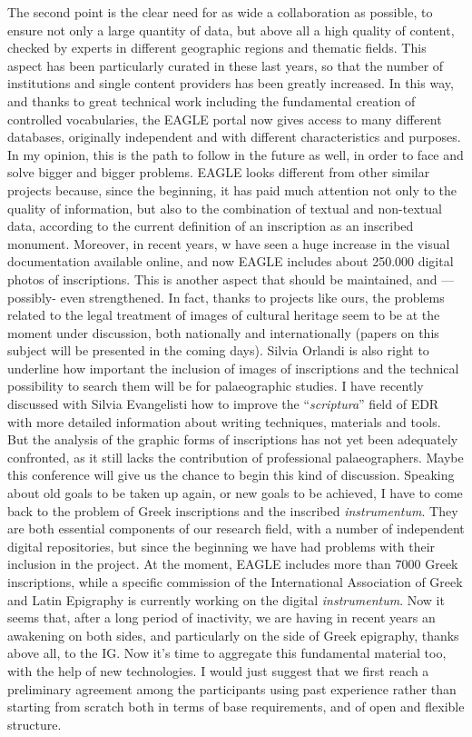 The second point is the clear need for as wide a collaboration as possible, to ensure not only a large quantity of data, but above all a high quality of content, checked by experts in different geographic regions and thematic fields. This aspect has been particularly curated in these last years, so that the number of institutions and single content providers has been greatly increased. In this way, and thanks to great technical work including the fundamental creation of controlled vocabularies, the EAGLE portal now gives access to many different databases, originally independent and with different characteristics and purposes. In my opinion, this is the path to follow in the future as well, in order to face and solve bigger and bigger problems.
EAGLE looks different from other similar projects because, since the beginning, it has paid much attention not only to the quality of information, but also to the combination of textual and non-textual data, according to the current definition of an inscription as an inscribed monument. Moreover, in recent years, w have seen a huge increase in the visual documentation available online, and now EAGLE includes about 250.000 digital photos of inscriptions. This is another aspect that should be maintained, and --- possibly- even strengthened. In fact, thanks to projects like ours, the problems related to the legal treatment of images of cultural heritage seem to be at the moment under discussion, both nationally and internationally (papers on this subject will be presented in the coming days). Silvia Orlandi is also right to underline how important the inclusion of images of inscriptions and the technical possibility to search them will be for palaeographic studies. I have recently discussed with Silvia Evangelisti how to improve the ``\emph{scriptura}'' field of EDR with more detailed information about writing techniques, materials and tools. But the analysis of the graphic forms of inscriptions has not yet been adequately confronted, as it still lacks the contribution of professional palaeographers. Maybe this conference will give us the chance to begin this kind of discussion.
Speaking about old goals to be taken up again, or new goals to be achieved, I have to come back to the problem of Greek inscriptions and the inscribed \emph{instrumentum}. They are both essential components of our research field, with a number of independent digital repositories, but since the beginning we have had problems with their inclusion in the project. At the moment, EAGLE includes more than 7000 Greek inscriptions, while a specific commission of the International Association of Greek and Latin Epigraphy is currently working on the digital \emph{instrumentum}. Now it seems that, after a long period of inactivity, we are having in recent years an awakening on both sides, and particularly on the side of Greek epigraphy, thanks above all, to the IG. Now it’s time to aggregate this fundamental material too, with the help of new technologies. I would just suggest that we first reach a preliminary agreement among the participants using past experience rather than starting from scratch both in terms of base requirements, and of open and flexible structure.
